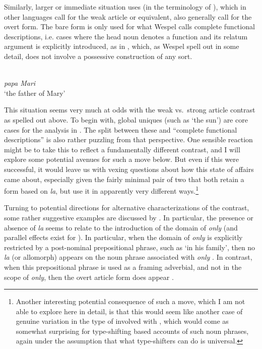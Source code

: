\documentclass[output=paper
,modfonts
,nonflat]{langscibook}
\begin{document}
Similarly, larger or immediate situation uses (in the
terminology of \citealt{Hawkins1978}), which in other languages call
for the weak article or equivalent, also generally call for the overt
form. The bare form is only used for what Wespel calls complete
functional descriptions, i.e. cases where the head noun denotes a
function and its relatum argument is explicitly introduced, as in
, which, as Wespel spell out in some detail, does not involve
a possessive construction of any sort.



\begin{exe}
\ex\label{ex:schwarz:25}  \citep{Wespel2008}\\
\textit{papa Mari}\\
`the father of Mary' 
\end{exe}

This situation seems very much at odds with the weak vs.\ strong
article contrast as spelled out above. To begin with, global uniques
(such as `the sun') are core cases for the analysis in
\citet{Schwarz2009}. The split between these and ``complete functional
descriptions'' is also rather puzzling from that perspective. One
sensible reaction might be to take this to reflect a fundamentally
different contrast, and I will explore some potential avenues for such
a move below. But even if this were successful, it would leave us with
vexing questions about how this state of affairs came about,
especially given the fairly minimal pair of two 
that both retain a form based on  \textit{la}, but use it in
apparently very different ways.\footnote{Another interesting potential
  consequence of such a move, which I am not able to explore here in
  detail, is that this would seem like another case of genuine
  variation in the type of  involved with , which would come as somewhat surprising for type-shifting
  based accounts of such noun phrases, again under the assumption that
  what type-shifters can do is universal.}

Turning to potential directions for alternative characterizations of
the  contrast, some rather suggestive examples are
discussed by \citet{Wespel2008}. In particular, the presence or
absence of \textit{la} seems to
relate to the introduction of the domain of \textit{only}
(and parallel effects exist for ). In particular, when the
domain of \textit{only} is explicitly restricted by a post-nominal
prepositional phrase, such as `in his family', then no \textit{la} (or
allomorph) appears on the noun phrase associated with \textit{only}
. In contrast, when this prepositional phrase is used as a
framing adverbial, and not in the scope of \textit{only}, then the
overt article form does appear .
\end{document}
